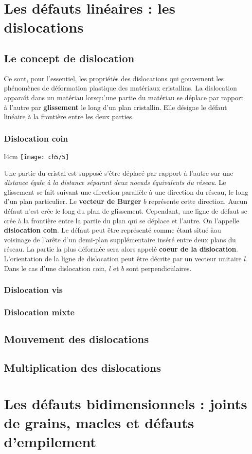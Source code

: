 \section{Les défauts linéaires : les dislocations}
	\subsection{Le concept de dislocation}
	Ce sont, pour l'essentiel, les propriétés des dislocations qui gouvernent les phénomènes de déformation plastique des matériaux cristallins. La dislocation apparaît dans un matériau lorsqu'une partie du matériau se déplace par rapport à l'autre par \textbf{glissement} le long d'un plan cristallin. Elle désigne le défaut linéaire à la frontière entre les deux parties. 
	
	\newpage
	\subsubsection{Dislocation coin}
	\begin{wrapfigure}[12]{l}{4cm}
	\vspace{-5mm}
	\texttt{[image: ch5/5]}
	\end{wrapfigure}
	Une partie du cristal est supposé s'être déplacé par rapport à l'autre sur une \textit{distance égale à la distance séparant deux noeuds équivalents du réseau}. Le glissement se fait suivant une direction parallèle à une direction du réseau, le long d'un plan particulier. Le \textbf{vecteur de Burger} $b$ représente cette direction. Aucun défaut n'est crée le long du plan de glissement. Cependant, une ligne de défaut se crée à la frontière entre la partie du plan qui se déplace et l'autre. On l'appelle \textbf{dislocation coin}. Le défaut peut être représenté comme étant situé àau voisinage de l'arête d'un demi-plan supplémentaire inséré entre deux plans du réseau. La partie la plus déformée sera alors appelé \textbf{coeur de la dislocation}. L'orientation de la ligne de dislocation peut être décrite par un vecteur unitaire $l$. Dans le cas d'une dislocation coin, $l$ et $b$ sont perpendiculaires. 
	\subsubsection{Dislocation vis}
	\subsubsection{Dislocation mixte}
	\subsection{Mouvement des dislocations}
	\subsection{Multiplication des dislocations}
	
\section{Les défauts bidimensionnels : joints de grains, macles et défauts d'empilement}
